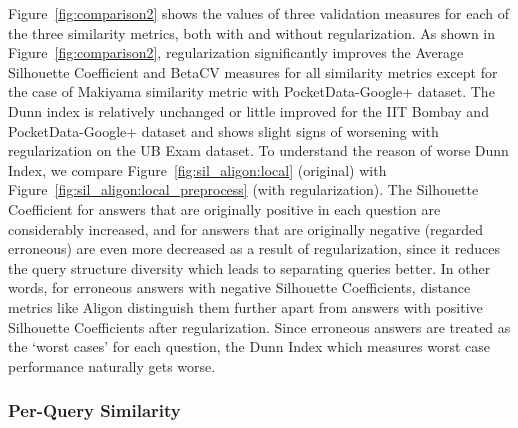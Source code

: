 Figure~\ref{fig:comparison2} shows the values of three validation measures for each of the three similarity metrics, both with and without regularization.
As shown in Figure~\ref{fig:comparison2}, regularization significantly improves the Average Silhouette Coefficient and BetaCV measures for all similarity metrics except for the case of Makiyama similarity metric with PocketData-Google+ dataset.
The Dunn index is relatively unchanged or little improved for the IIT Bombay and PocketData-Google+ dataset and shows slight signs of worsening with regularization on the UB Exam dataset. To understand the reason of worse Dunn Index, we compare Figure~\ref{fig:sil_aligon:local} (original) with Figure~\ref{fig:sil_aligon:local_preprocess} (with regularization). 
The Silhouette Coefficient for answers that are originally positive in each question are considerably increased, and for answers that are originally negative (regarded erroneous) are even more decreased as a result of regularization, since it reduces the query structure diversity which leads to separating queries better.
In other words, for erroneous answers with negative Silhouette Coefficients, distance metrics like Aligon distinguish them further apart from answers with positive Silhouette Coefficients after regularization. Since erroneous answers are treated as the `worst cases' for each question, the Dunn Index which measures worst case performance naturally gets worse.


\subsubsection{Per-Query Similarity}

